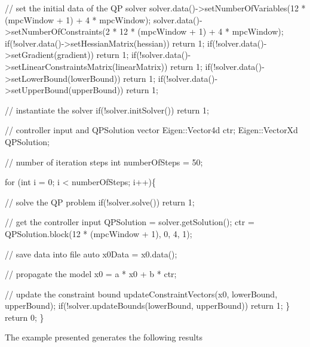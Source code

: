 \begin{DoxyCodeInclude}
    \textcolor{comment}{// set the initial data of the QP solver}
    solver.data()->setNumberOfVariables(12 * (mpcWindow + 1) + 4 * mpcWindow);
    solver.data()->setNumberOfConstraints(2 * 12 * (mpcWindow + 1) +  4 * mpcWindow);
    \textcolor{keywordflow}{if}(!solver.data()->setHessianMatrix(hessian)) \textcolor{keywordflow}{return} 1;
    \textcolor{keywordflow}{if}(!solver.data()->setGradient(gradient)) \textcolor{keywordflow}{return} 1;
    \textcolor{keywordflow}{if}(!solver.data()->setLinearConstraintsMatrix(linearMatrix)) \textcolor{keywordflow}{return} 1;
    \textcolor{keywordflow}{if}(!solver.data()->setLowerBound(lowerBound)) \textcolor{keywordflow}{return} 1;
    \textcolor{keywordflow}{if}(!solver.data()->setUpperBound(upperBound)) \textcolor{keywordflow}{return} 1;

    \textcolor{comment}{// instantiate the solver}
    \textcolor{keywordflow}{if}(!solver.initSolver()) \textcolor{keywordflow}{return} 1;

    \textcolor{comment}{// controller input and QPSolution vector}
    Eigen::Vector4d ctr;
    Eigen::VectorXd QPSolution;

    \textcolor{comment}{// number of iteration steps}
    \textcolor{keywordtype}{int} numberOfSteps = 50;

    \textcolor{keywordflow}{for} (\textcolor{keywordtype}{int} i = 0; i < numberOfSteps; i++)\{

        \textcolor{comment}{// solve the QP problem}
        \textcolor{keywordflow}{if}(!solver.solve()) \textcolor{keywordflow}{return} 1;

        \textcolor{comment}{// get the controller input}
        QPSolution = solver.getSolution();
        ctr = QPSolution.block(12 * (mpcWindow + 1), 0, 4, 1);

        \textcolor{comment}{// save data into file}
        \textcolor{keyword}{auto} x0Data = x0.data();

        \textcolor{comment}{// propagate the model}
        x0 = a * x0 + b * ctr;

        \textcolor{comment}{// update the constraint bound}
        updateConstraintVectors(x0, lowerBound, upperBound);
        \textcolor{keywordflow}{if}(!solver.updateBounds(lowerBound, upperBound)) \textcolor{keywordflow}{return} 1;
      \}
    \textcolor{keywordflow}{return} 0;
\}
\end{DoxyCodeInclude}


The example presented generates the following results  